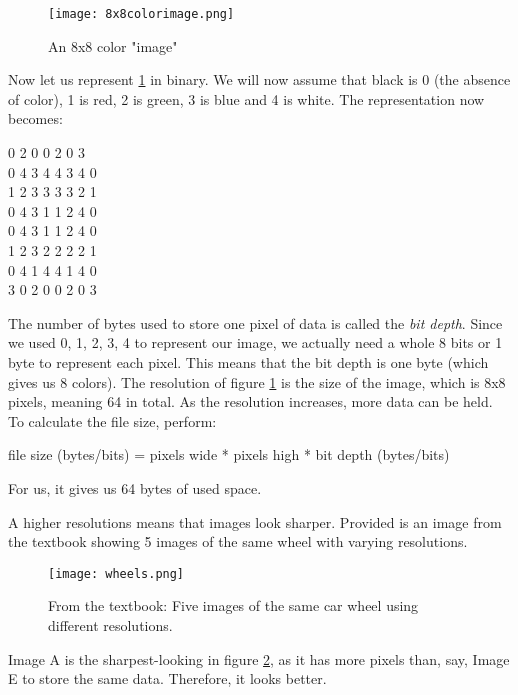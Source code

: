 \documentclass[../main.tex]{subfiles}
\begin{document}
\medskip
\begin{figure}[H]
    \centering
    \texttt{[image: 8x8colorimage.png]}
    \caption{An 8x8 color "image"}
    \label{fig:8x8colorimage}
\end{figure}

Now let us represent \ref{fig:8x8colorimage} in binary. We will now assume that black is 0 (the absence of color), 1 is red, 2 is green, 3 is blue and 4 is white. The representation now becomes:

\newpage 

{\ccmono{} 0 2 0 0 2 0 3\\
    0 4 3 4 4 3 4 0\\
    1 2 3 3 3 3 2 1\\
    0 4 3 1 1 2 4 0\\
    0 4 3 1 1 2 4 0\\
    1 2 3 2 2 2 2 1\\
    0 4 1 4 4 1 4 0\\
    3 0 2 0 0 2 0 3\\
}

\medskip

The number of bytes used to store one pixel of data is called the \emph{bit depth}. Since we used 0, 1, 2, 3, 4 to represent our image, we actually need a whole 8 bits or 1 byte to represent each pixel. This means that the bit depth is one byte (which gives us 8 colors). The resolution of figure \ref{fig:8x8colorimage} is the size of the image, which is 8x8 pixels, meaning 64 in total. As the resolution increases, more data can be held. To calculate the file size, perform:

{\centering\ccmono
file size (bytes/bits) = pixels wide * pixels high * bit depth (bytes/bits)
}

For us, it gives us 64 bytes of used space.

A higher resolutions means that images look sharper. Provided is an image from the textbook showing 5 images of the same wheel with varying resolutions. 

\begin{figure}[H]
    \centering
    \texttt{[image: wheels.png]}
    \caption{From the textbook: Five images of the same car wheel using different resolutions.}
    \label{fig:wheel}
\end{figure}

Image A is the sharpest-looking in figure \ref{fig:wheel}, as it has more pixels than, say, Image E to store the same data. Therefore, it looks better.
\end{document}
